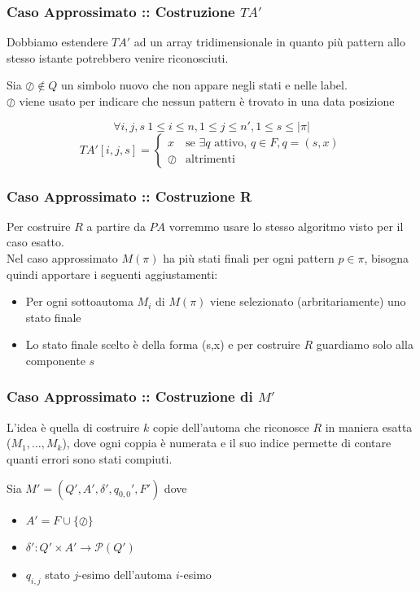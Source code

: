 \documentclass{beamer}
\begin{document}
\begin{frame}
\frametitle{Caso Approssimato :: Costruzione $TA'$}
Dobbiamo estendere $TA'$ ad un array tridimensionale in quanto più pattern allo stesso istante potrebbero venire riconosciuti.\\
\begin{definition}
Sia $\oslash \not\in Q$ un simbolo nuovo che non appare negli stati e nelle label. \\
$\oslash$ viene usato per indicare che nessun pattern è trovato in una data posizione
\end{definition}

\begin{equation*}
\forall  i,j,s\ 1\leq i \leq n, 1 \leq j \leq n',1 \leq s \leq |\pi|
\end{equation*}
\begin{equation*}
TA'[i,j,s]= 
\begin{cases} 
x & \text{se $\exists q$ attivo, $q\in F, q = (s,x)$}
\\
\oslash  &\text{altrimenti}
\end{cases}
\end{equation*}
\end{frame}


\begin{frame}
\frametitle{Caso Approssimato :: Costruzione R}

Per costruire $R$ a partire da $PA$ vorremmo usare lo stesso algoritmo visto per il caso esatto.\\
Nel caso approssimato $M(\pi)$ ha più stati finali per ogni pattern $p \in \pi$, bisogna quindi apportare i seguenti aggiustamenti:
\begin{itemize}
\item Per ogni sottoautoma $M_i$ di $M(\pi)$ viene selezionato (arbritariamente) uno stato finale
\item Lo stato finale scelto è della forma (s,x) e per costruire $R$ guardiamo solo alla componente $s$
\end{itemize}

\end{frame}


\begin{frame}
\frametitle{Caso Approssimato :: Costruzione di $M'$ }

L'idea è quella di costruire $k$ copie dell'automa che riconosce $R$ in maniera esatta ($M_1,\dots,M_k$), dove ogni coppia è numerata e il suo indice permette di contare quanti errori sono stati compiuti.
\begin{definition}
Sia $M' = (Q',A',\delta',q_{0,0}', F')$ dove
	\begin{itemize}
		\item $A' = F \cup \{\oslash\}$
		\item $\delta' : Q' \times A' \to \mathcal{P}(Q')$
		\item $q_{i,j}$ stato $j$-esimo dell'automa $i$-esimo
	\end{itemize}
\end{definition}





\end{frame}
\end{document}
